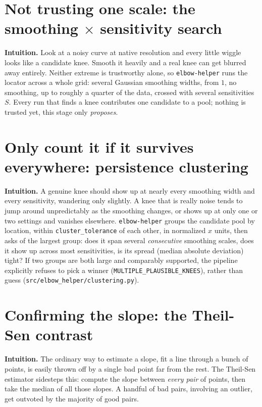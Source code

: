 \documentclass[11pt]{article}
\newcommand{\code}[1]{\texttt{#1}}
\begin{document}
\section{Not trusting one scale: the smoothing $\times$ sensitivity search}
\label{sec:multiscale}

\textbf{Intuition.} Look at a noisy curve at native resolution and every
little wiggle looks like a candidate knee. Smooth it heavily and a real
knee can get blurred away entirely. Neither extreme is trustworthy alone,
so \code{elbow-helper} runs the locator across a whole grid: several Gaussian
smoothing widths, from $1$, no smoothing, up to roughly a quarter of the
data, crossed with several sensitivities $S$. Every run that finds a knee
contributes one candidate to a pool; nothing is trusted yet, this stage
only \emph{proposes}.

\section{Only count it if it survives everywhere: persistence clustering}

\textbf{Intuition.} A genuine knee should show up at nearly every smoothing
width and every sensitivity, wandering only slightly. A knee that is really
noise tends to jump around unpredictably as the smoothing changes, or shows
up at only one or two settings and vanishes elsewhere. \code{elbow-helper}
groups the candidate pool by location, within \code{cluster\_tolerance} of
each other, in normalized $x$ units, then asks of the largest group: does
it span several \emph{consecutive} smoothing scales, does it show up
across most sensitivities, is its spread (median absolute deviation)
tight? If two groups are both large and comparably supported, the pipeline
explicitly refuses to pick a winner (\code{MULTIPLE\_PLAUSIBLE\_KNEES}),
rather than guess (\code{src/elbow\_helper/clustering.py}).

\section{Confirming the slope: the Theil-Sen contrast}

\textbf{Intuition.} The ordinary way to estimate a slope, fit a line
through a bunch of points, is easily thrown off by a single bad point far
from the rest. The Theil-Sen estimator sidesteps this: compute the slope
between \emph{every pair} of points, then take the median of all those
slopes. A handful of bad pairs, involving an outlier, get outvoted by the
majority of good pairs.
\end{document}
